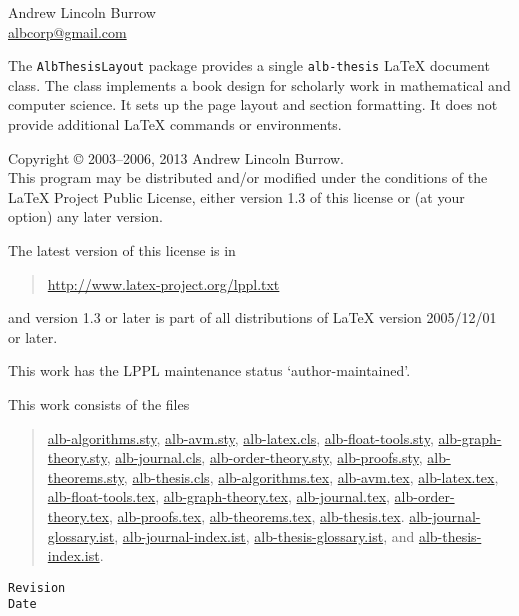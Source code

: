 \documentclass[11pt,a4paper,oneside,titlepage]{alb-latex}
\begin{document}


\begin{albTitlePage}


  Andrew Lincoln Burrow\\
  \url{albcorp@gmail.com}



  The \texttt{AlbThesisLayout} package provides a single
  \texttt{alb-thesis} \LaTeX{} document class.  The class implements a
  book design for scholarly work in mathematical and computer science.
  It sets up the page layout and section formatting.  It does not
  provide additional \LaTeX{} commands or environments.



  Copyright \copyright{} 2003--2006, 2013 Andrew Lincoln Burrow.\\
  This program may be distributed and/or modified under the conditions
  of the \LaTeX{} Project Public License, either version 1.3 of this
  license or (at your option) any later version.

  \medskip{}

  The latest version of this license is in
  \begin{quote}
    \url{http://www.latex-project.org/lppl.txt}
  \end{quote}
  and version 1.3 or later is part of all distributions of LaTeX version
  2005/12/01 or later.

  \medskip{}

  This work has the LPPL maintenance status `author-maintained'.

  \medskip{}

  This work consists of the files
  \begin{quote}
    \begin{flushleft}
      \url{alb-algorithms.sty}, \url{alb-avm.sty}, \url{alb-latex.cls},
      \url{alb-float-tools.sty}, \url{alb-graph-theory.sty},
      \url{alb-journal.cls}, \url{alb-order-theory.sty},
      \url{alb-proofs.sty}, \url{alb-theorems.sty},
      \url{alb-thesis.cls}, \url{alb-algorithms.tex}, \url{alb-avm.tex},
      \url{alb-latex.tex}, \url{alb-float-tools.tex},
      \url{alb-graph-theory.tex}, \url{alb-journal.tex},
      \url{alb-order-theory.tex}, \url{alb-proofs.tex},
      \url{alb-theorems.tex}, \url{alb-thesis.tex}.
      \url{alb-journal-glossary.ist}, \url{alb-journal-index.ist},
      \url{alb-thesis-glossary.ist}, and \url{alb-thesis-index.ist}.
    \end{flushleft}
  \end{quote}



  \verb$Revision$\\
  \verb$Date$

\end{albTitlePage}
\end{document}
